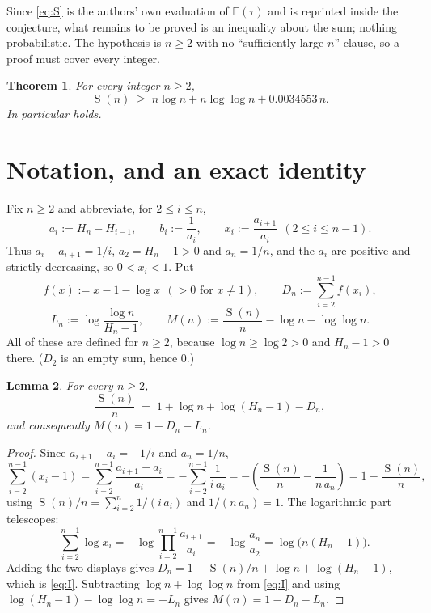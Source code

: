 \documentclass[11pt]{amsart}
\newtheorem{theorem}{Theorem}
\newtheorem{lemma}[theorem]{Lemma}
\DeclareMathOperator{\Sfun}{S}
\newcommand{\Hn}{H}
\begin{document}
\medskip
Since \eqref{eq:S} is the authors' own evaluation of $\mathbb E(\tau)$ and is reprinted
inside the conjecture, what remains to be proved is an inequality about the sum; nothing
probabilistic. The hypothesis is $n\ge2$ with no ``sufficiently large $n$'' clause, so a
proof must cover every integer.

\begin{theorem}\label{thm:main}
For every integer $n\ge2$,
\[
 \Sfun(n)\;\ge\;n\log n+n\log\log n+0.0034553\,n .
\]
In particular \cite[Conjecture~15.8]{GL} holds.
\end{theorem}

\section{Notation, and an exact identity}

Fix $n\ge2$ and abbreviate, for $2\le i\le n$,
\[
 a_i:=\Hn_n-\Hn_{i-1},\qquad
 b_i:=\frac1{a_i},\qquad
 x_i:=\frac{a_{i+1}}{a_i}\ \ (2\le i\le n-1).
\]
Thus $a_i-a_{i+1}=1/i$, $a_2=\Hn_n-1>0$ and $a_n=1/n$, and the $a_i$ are positive and
strictly decreasing, so $0<x_i<1$. Put
\[
 f(x):=x-1-\log x\ \ (>0\text{ for }x\ne1),\qquad
 D_n:=\sum_{i=2}^{n-1}f(x_i),
\]
\[
 L_n:=\log\frac{\log n}{\Hn_n-1},\qquad
 M(n):=\frac{\Sfun(n)}{n}-\log n-\log\log n .
\]
All of these are defined for $n\ge2$, because $\log n\ge\log2>0$ and $\Hn_n-1>0$
there. ($D_2$ is an empty sum, hence $0$.)

\begin{lemma}\label{lem:identity}
For every $n\ge2$,
\begin{equation}\label{eq:I}
 \frac{\Sfun(n)}{n}\;=\;1+\log n+\log(\Hn_n-1)-D_n ,
\end{equation}
and consequently $M(n)=1-D_n-L_n$.
\end{lemma}

\begin{proof}
Since $a_{i+1}-a_i=-1/i$ and $a_n=1/n$,
\[
 \sum_{i=2}^{n-1}(x_i-1)
 =\sum_{i=2}^{n-1}\frac{a_{i+1}-a_i}{a_i}
 =-\sum_{i=2}^{n-1}\frac1{i\,a_i}
 =-\left(\frac{\Sfun(n)}{n}-\frac1{n\,a_n}\right)
 =1-\frac{\Sfun(n)}{n},
\]
using $\Sfun(n)/n=\sum_{i=2}^{n}1/(i\,a_i)$ and $1/(n\,a_n)=1$. The logarithmic part
telescopes:
\[
 -\sum_{i=2}^{n-1}\log x_i
 =-\log\prod_{i=2}^{n-1}\frac{a_{i+1}}{a_i}
 =-\log\frac{a_n}{a_2}
 =\log\bigl(n(\Hn_n-1)\bigr).
\]
Adding the two displays gives $D_n=1-\Sfun(n)/n+\log n+\log(\Hn_n-1)$, which is
\eqref{eq:I}. Subtracting $\log n+\log\log n$ from \eqref{eq:I} and using
$\log(\Hn_n-1)-\log\log n=-L_n$ gives $M(n)=1-D_n-L_n$.
\end{proof}
\end{document}
